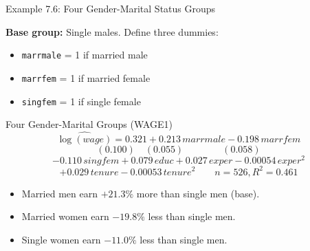 \documentclass[aspectratio=169, 12pt]{beamer}
\begin{document}
\begin{frame}[shrink=28]{Example 7.6: Four Gender-Marital Status Groups}

  \textbf{Base group:} Single males. Define three dummies:
  \begin{itemize}
    \item \texttt{marrmale} = 1 if married male
    \item \texttt{marrfem} = 1 if married female
    \item \texttt{singfem} = 1 if single female
  \end{itemize}

  \medskip

  \begin{examplebox}{Four Gender-Marital Groups (WAGE1)}
    \[
      \widehat{\log(\textit{wage})} = 0.321 + 0.213 \, \textit{marrmale} - 0.198 \, \textit{marrfem}
    \]
    \[
      (0.100) \quad (0.055) \quad\quad\quad\quad (0.058)
    \]
    \[
      - 0.110 \, \textit{singfem} + 0.079 \, \textit{educ} + 0.027 \, \textit{exper} - 0.00054 \, \textit{exper}^2
    \]
    \[
      + 0.029 \, \textit{tenure} - 0.00053 \, \textit{tenure}^2 \quad\quad n = 526, R^2 = 0.461
    \]
  \end{examplebox}

  \medskip

  \begin{keybox}
    \begin{itemize}
      \item Married men earn $+21.3\%$ more than single men (base).
      \item Married women earn $-19.8\%$ less than single men.
      \item Single women earn $-11.0\%$ less than single men.
    \end{itemize}
  \end{keybox}

\end{frame}
\end{document}

